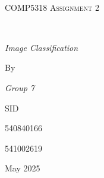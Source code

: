 \begin{titlepage}
	\centering
	\vspace*{3cm}
	\hrulefill\\
	\vspace{0.5cm}
	{\scshape\LARGE COMP5318 Assignment 2\par}
	\vspace{0.5cm}
	\hrulefill\\
	\vspace{1.5cm}

	{\normalsize\itshape Image Classification\par}
	
	\vspace{1.2cm}
	{\normalsize By \par}

	\vspace{1.2cm}
	{\normalsize\itshape Group 7}

    \vspace{1.8cm}
	{\normalsize SID}
	
	\vspace{0.6cm}
	{\normalsize 540840166}

	\vspace{0.6cm}
	{\normalsize 541002619}
	
	\vspace{4.5cm}
	{\normalsize May 2025 \par}

\end{titlepage}